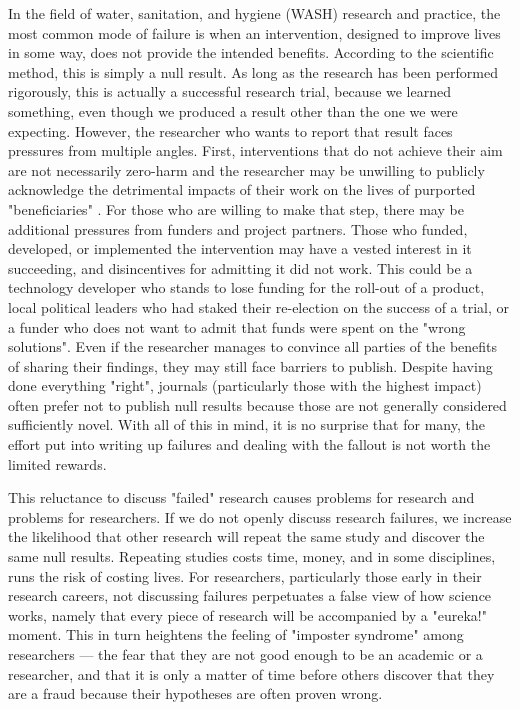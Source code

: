 \documentclass[twocolumn, serif, authordate, editorial]{jote-article}
\begin{document}
In the field of water, sanitation, and hygiene (WASH) research and practice, the most common mode of failure is when an intervention, designed to improve lives in some way, does not provide the intended benefits. According to the scientific method, this is simply a null result. As long as the research has been performed rigorously, this is actually a successful research trial, because we learned something, even though we produced a result other than the one we were expecting. However, the researcher who wants to report that result faces pressures from multiple angles. First, interventions that do not achieve their aim are not necessarily zero-harm and the researcher may be unwilling to publicly acknowledge the detrimental impacts of their work on the lives of purported "beneficiaries" \parencite{Barrington2017}. For those who are willing to make that step, there may be additional pressures from funders and project partners. Those who funded, developed, or implemented the intervention may have a vested interest in it succeeding, and disincentives for admitting it did not work. This could be a technology developer who stands to lose funding for the roll-out of a product, local political leaders who had staked their re-election on the success of a trial, or a funder who does not want to admit that funds were spent on the "wrong solutions". Even if the researcher manages to convince all parties of the benefits of sharing their findings, they may still face barriers to publish. Despite having done everything "right", journals (particularly those with the highest impact) often prefer not to publish null results because those are not generally considered sufficiently novel. With all of this in mind, it is no surprise that for many, the effort put into writing up failures and dealing with the fallout is not worth the limited rewards.

This reluctance to discuss "failed" research causes problems for research and problems for researchers. If we do not openly discuss research failures, we increase the likelihood that other research will repeat the same study and discover the same null results. Repeating studies costs time, money, and in some disciplines, runs the risk of costing lives. For researchers, particularly those early in their research careers, not discussing failures perpetuates a false view of how science works, namely that every piece of research will be accompanied by a "eureka!" moment. This in turn heightens the feeling of "imposter syndrome" among researchers — the fear that they are not good enough to be an academic or a researcher, and that it is only a matter of time before others discover that they are a fraud because their hypotheses are often proven wrong.
\end{document}
